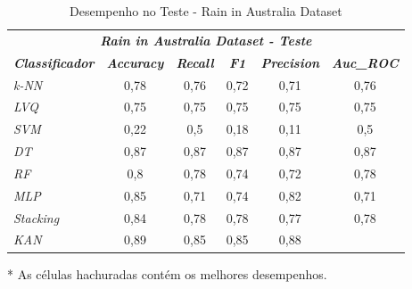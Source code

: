 \documentclass[journal]{IEEEtran}
\begin{document}
\begin{table}[h!]
	\caption{Desempenho no Teste - Rain in Australia Dataset}
	\label{tab:19}
	\begin{threeparttable}
		\begin{tabular}{lccccc}
			\hline
			\multicolumn{6}{c}{\textit{\textbf{Rain in Australia Dataset - Teste}}}                                                                                                                              \\
			\multicolumn{1}{l|}{\textit{\textbf{Classificador}}} & \textit{\textbf{Accuracy}} & \textit{\textbf{Recall}}  & \textit{\textbf{F1}}      & \textit{\textbf{Precision}} & \textit{\textbf{Auc\_ROC}} \\ \hline
			\multicolumn{1}{l|}{\textit{k-NN}}                   & 0,78                       & 0,76                      & 0,72                      & 0,71                        & 0,76                       \\
			\multicolumn{1}{l|}{\textit{LVQ}}                    & 0,75                       & 0,75                      & 0,75                      & 0,75                        & 0,75                       \\
			\multicolumn{1}{l|}{\textit{SVM}}                    & 0,22                       & 0,5                       & 0,18                      & 0,11                        & 0,5                        \\
			\multicolumn{1}{l|}{\textit{DT}}                     & 0,87                       & \cellcolor{lightgray}0,87 & \cellcolor{lightgray}0,87 & 0,87                        & \cellcolor{lightgray}0,87  \\
			\multicolumn{1}{l|}{\textit{RF}}                     & 0,8                        & 0,78                      & 0,74                      & 0,72                        & 0,78                       \\
			\multicolumn{1}{l|}{\textit{MLP}}                    & 0,85                       & 0,71                      & 0,74                      & 0,82                        & 0,71                       \\
			\multicolumn{1}{l|}{\textit{Stacking}}               & 0,84                       & 0,78                      & 0,78                      & 0,77                        & 0,78                       \\
			\multicolumn{1}{l|}{\textit{KAN}}                    & \cellcolor{lightgray}0,89  & 0,85                      & 0,85                      & \cellcolor{lightgray}0,88   &                            \\
			\hline
		\end{tabular}
		\begin{tablenotes}\footnotesize
			\item[*] As células hachuradas contém os melhores desempenhos.
		\end{tablenotes}
	\end{threeparttable}
\end{table}
\end{document}
